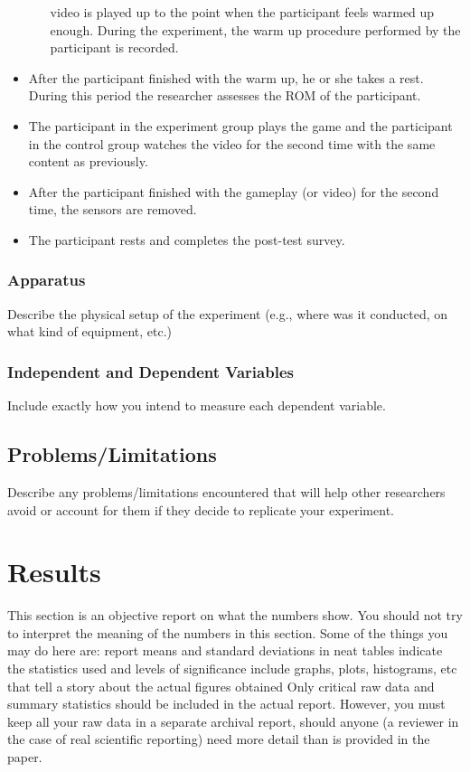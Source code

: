 \begin{itemize}
\begin{itemize}
video is played up to the point when the participant feels warmed up enough. During the experiment, the warm up procedure performed by the participant is recorded.
\end{itemize}
\item After the participant finished with the warm up, he or she takes a rest. During this period the researcher assesses the ROM of the participant. 
\item The participant in the experiment group plays the game and the participant in the control group watches the video for the second time with the same content as previously.%
\item After the participant finished with the gameplay (or video) for the second time, the sensors are removed.
\item The participant rests and completes the post-test survey. 
\end{itemize}
\subsubsection{Apparatus}
Describe the physical setup of the experiment (e.g., where was it conducted, on what kind of equipment, etc.)
\subsubsection{Independent and Dependent Variables}
Include exactly how you intend to measure each dependent variable. 

\subsection{Problems/Limitations}
Describe any problems/limitations encountered that will help other researchers avoid or account for them if they decide to replicate your experiment.
\section{Results}

This section is an objective report on what the numbers show. You should not try to interpret the meaning of the numbers in this section. Some of the things you may do here are: 
report means and standard deviations in neat tables 
indicate the statistics used and levels of significance 
include graphs, plots, histograms, etc that tell a story about the actual figures obtained 
Only critical raw data and summary statistics should be included in the actual report. However, you must keep all your raw data in a separate archival report, should anyone (a reviewer in the case of real scientific reporting) need more detail than is provided in the paper. 
